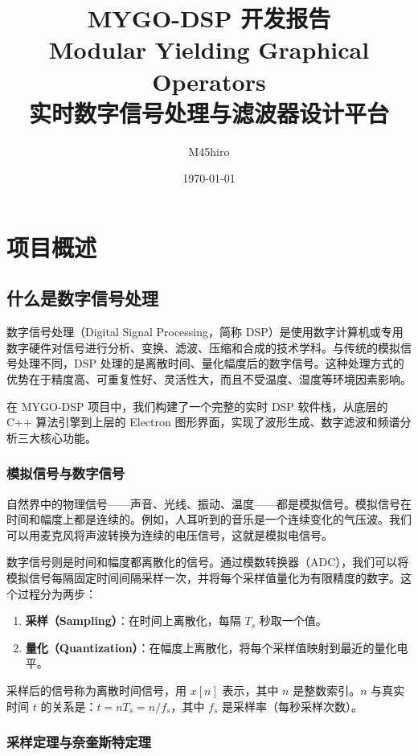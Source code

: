 ﻿\documentclass[12pt,a4paper,oneside]{ctexbook}
\title{{\Huge \textbf{MYGO-DSP 开发报告}} \\[0.5cm]
       {\Large Modular Yielding Graphical Operators} \\[0.3cm]
       {\large 实时数字信号处理与滤波器设计平台}}
\author{M45hiro}
\date{\today}
\begin{document}
\maketitle
\tableofcontents
\clearpage

\setcounter{chapter}{0}

\chapter{项目概述}

\section{什么是数字信号处理}

数字信号处理（Digital Signal Processing，简称 DSP）是使用数字计算机或专用数字硬件对信号进行分析、变换、滤波、压缩和合成的技术学科。与传统的模拟信号处理不同，DSP 处理的是离散时间、量化幅度后的数字信号。这种处理方式的优势在于精度高、可重复性好、灵活性大，而且不受温度、湿度等环境因素影响。

在 MYGO-DSP 项目中，我们构建了一个完整的实时 DSP 软件栈，从底层的 C++ 算法引擎到上层的 Electron 图形界面，实现了波形生成、数字滤波和频谱分析三大核心功能。

\subsection{模拟信号与数字信号}

自然界中的物理信号——声音、光线、振动、温度——都是模拟信号。模拟信号在时间和幅度上都是连续的。例如，人耳听到的音乐是一个连续变化的气压波。我们可以用麦克风将声波转换为连续的电压信号，这就是模拟电信号。

数字信号则是时间和幅度都离散化的信号。通过模数转换器（ADC），我们可以将模拟信号每隔固定时间间隔采样一次，并将每个采样值量化为有限精度的数字。这个过程分为两步：

\begin{enumerate}
    \item \textbf{采样（Sampling）}：在时间上离散化，每隔 \(T_s\) 秒取一个值。
    \item \textbf{量化（Quantization）}：在幅度上离散化，将每个采样值映射到最近的量化电平。
\end{enumerate}

采样后的信号称为离散时间信号，用 \(x[n]\) 表示，其中 \(n\) 是整数索引。\(n\) 与真实时间 \(t\) 的关系是：\(t = n T_s = n / f_s\)，其中 \(f_s\) 是采样率（每秒采样次数）。

\subsection{采样定理与奈奎斯特定理}
\end{document}
